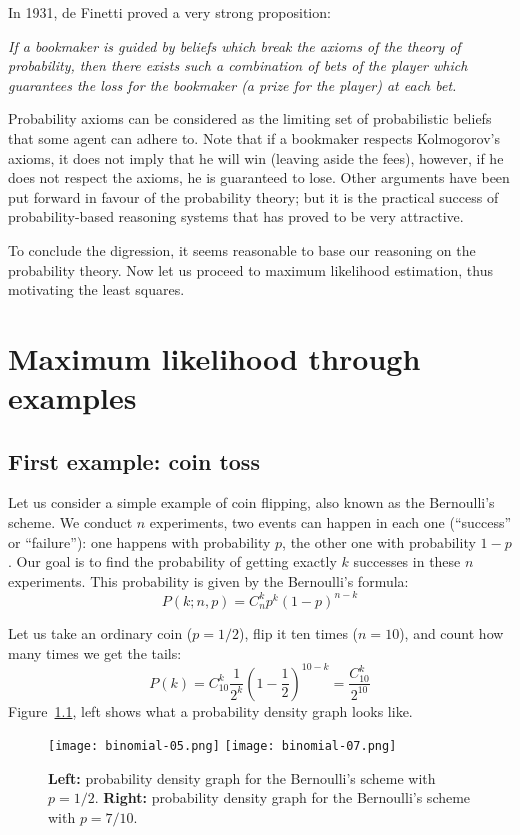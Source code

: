 \documentclass[notitlepage,oneside]{book}
\begin{document}
In 1931, de Finetti proved a very strong proposition:

\vspace{4mm}

\textit{If a bookmaker is guided by beliefs which break the axioms of the theory of probability,
then there exists such a combination of bets of the player which guarantees the loss for the bookmaker (a prize for the player) at each bet.
}

\vspace{4mm}

Probability axioms can be considered as the limiting set of probabilistic beliefs that some agent can adhere to.
Note that if a bookmaker respects Kolmogorov's axioms, it does not imply that he will win (leaving aside the fees),
however, if he does not respect the axioms, he is guaranteed to lose.
Other arguments have been put forward in favour of the probability theory;
but it is the practical success of probability-based reasoning systems that has proved to be very attractive.

To conclude the digression, it seems reasonable to base our reasoning on the probability theory.
Now let us proceed to maximum likelihood estimation, thus motivating the least squares.

\chapter{Maximum likelihood through examples}
\section{First example: coin toss}
Let us consider a simple example of coin flipping, also known as the Bernoulli's scheme. 
We conduct $n$ experiments, two events can happen in each one (``success'' or ``failure''): 
one happens with probability $p$, the other one with probability $1-p$. 
Our goal is to find the probability of getting exactly $k$ successes in these $n$ experiments. 
This probability is given by the Bernoulli's formula:
$$
P(k;n,p) = C_n^k p^k (1-p)^{n-k}
$$

Let us take an ordinary coin ($p=1/2$), flip it ten times ($n=10$), and count how many times we get the tails:
$$P(k) = C_{10}^k \frac{1}{2^k}\left(1-\frac{1}{2}\right)^{10-k} = \frac{C_{10}^k}{2^{10}}$$
Figure~\ref{fig:binomial}, left shows what a probability density graph looks like.

\begin{figure}[htb!]
\centering
\texttt{[image: binomial-05.png]}
\texttt{[image: binomial-07.png]}
\caption{\textbf{Left:} probability density graph for the Bernoulli's scheme with $p=1/2$. \textbf{Right:} probability density graph for the Bernoulli's scheme with $p=7/10$.}
\label{fig:binomial}
\end{figure}
\end{document}
